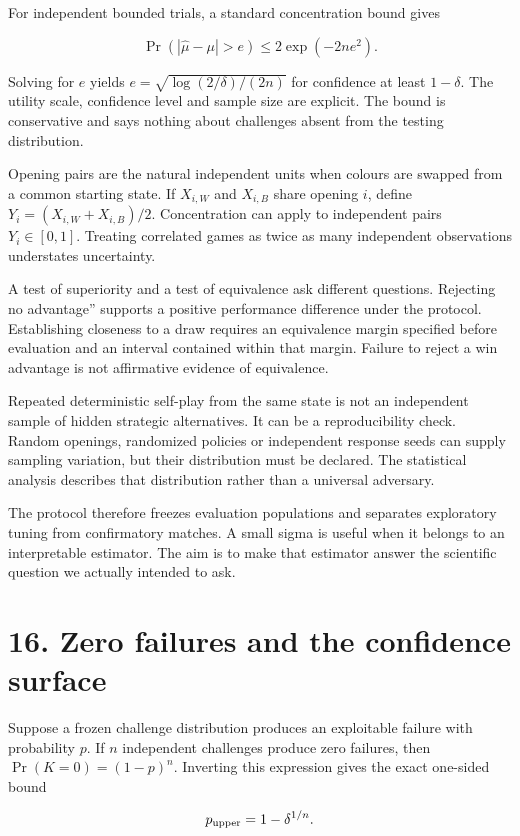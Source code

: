 \documentclass[10pt]{article}
\begin{document}
For independent bounded trials, a standard concentration bound gives

\[
\Pr(|\widehat\mu-\mu|>e)\le2\exp(-2ne^2).
\]

Solving for $e$ yields $e=\sqrt{\log(2/\delta)/(2n)}$ for confidence at least $1-\delta$. The utility scale, confidence level and sample size are explicit. The bound is conservative and says nothing about challenges absent from the testing distribution.

Opening pairs are the natural independent units when colours are swapped from a common starting state. If $X_{i,W}$ and $X_{i,B}$ share opening $i$, define $Y_i=(X_{i,W}+X_{i,B})/2$. Concentration can apply to independent pairs $Y_i\in[0,1]$. Treating correlated games as twice as many independent observations understates uncertainty.

A test of superiority and a test of equivalence ask different questions. Rejecting no advantage'' supports a positive performance difference under the protocol. Establishing closeness to a draw requires an equivalence margin specified before evaluation and an interval contained within that margin. Failure to reject a win advantage is not affirmative evidence of equivalence.

Repeated deterministic self-play from the same state is not an independent sample of hidden strategic alternatives. It can be a reproducibility check. Random openings, randomized policies or independent response seeds can supply sampling variation, but their distribution must be declared. The statistical analysis describes that distribution rather than a universal adversary.

The protocol therefore freezes evaluation populations and separates exploratory tuning from confirmatory matches. A small sigma is useful when it belongs to an interpretable estimator. The aim is to make that estimator answer the scientific question we actually intended to ask.

\clearpage
\section*{16. Zero failures and the confidence surface}
Suppose a frozen challenge distribution produces an exploitable failure with probability $p$. If $n$ independent challenges produce zero failures, then $\Pr(K=0)=(1-p)^n$. Inverting this expression gives the exact one-sided bound

\[
p_{\rm upper}=1-\delta^{1/n}.
\]
\end{document}
